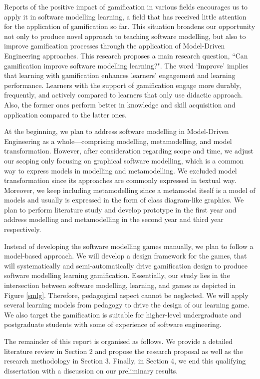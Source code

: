 \documentclass[12pt, a4paper]{report}
\begin{document}
Reports of the positive impact of gamification in various fields encourages us to apply it in software modelling learning, a field that has received little attention for the application of gamification so far. This situation broadens our opportunity not only to produce novel approach to teaching software modelling, but also to improve gamification processes through the application of Model-Driven Engineering approaches. This research proposes a main research question, ``Can gamification improve software modelling learning?". The word `Improve' implies that learning with gamification enhances learners' engagement and learning performance. Learners with the support of gamification engage more durably, frequently, and actively compared to learners that only use didactic approach. Also, the former ones perform better in knowledge and skill acquisition and application compared to the latter ones.   

At the beginning, we plan to address software modelling in Model-Driven Engineering as a whole---comprising modelling, metamodelling, and model transformation. However, after consideration regarding scope and time, we adjust our scoping only focusing on graphical software modelling, which is a common way to express models in modelling and metamodelling. We excluded model transformation since its approaches are commonly expressed in textual way. Moreover, we keep including metamodelling since a metamodel itself is a model of models and usually is expressed in the form of class diagram-like graphics. We plan to perform literature study and develop prototype in the first year and address modelling and metamodelling in the second year and third year respectively. 
    
Instead of developing the software modelling games manually, we plan to follow a model-based approach. We will develop a design framework for the games, that will systematically and semi-automatically drive gamification design to produce software modelling learning gamification. Essentially, our study lies in the intersection between software modelling, learning, and games as depicted in Figure \ref{smlg}. Therefore, pedagogical aspect cannot be neglected. We will apply several learning models from pedagogy to drive the design of our learning game. We also target the gamification is suitable for higher-level undergraduate and postgraduate students with some of experience of software engineering. 

The remainder of this report is organised as follows. We provide a detailed literature review in Section 2 and propose the research proposal as well as the research methodology in Section 3. Finally, in Section 4, we end this qualifying dissertation with a discussion on our preliminary results. 
\end{document}
